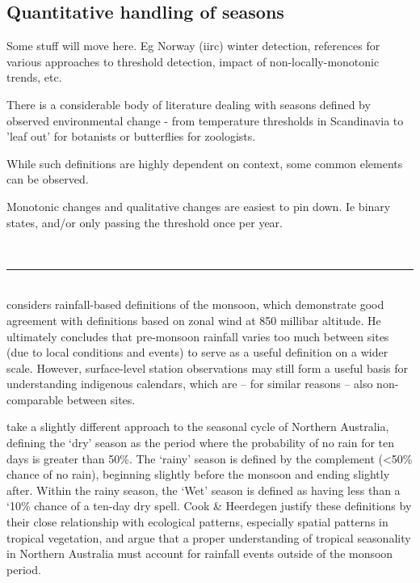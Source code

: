 \subsection{Quantitative handling of seasons}

Some stuff will move here.  Eg Norway (iirc) winter detection,
references for various approaches to threshold detection,
impact of non-locally-monotonic trends, etc.


There is a considerable body of literature dealing with seasons defined
by observed environmental change - from temperature thresholds in
Scandinavia to 'leaf out' for botanists or butterflies for zoologists.

While such definitions are highly dependent on context, some common
elements can be observed.

Monotonic changes and qualitative changes are easiest to pin down.
Ie binary states, and/or only passing the threshold once per year.


~\\ \hrule ~\\


\citet{holland1985} considers rainfall-based definitions of the
monsoon, which demonstrate good agreement with definitions based on zonal
wind at 850 millibar altitude.  He ultimately concludes that pre-monsoon
rainfall varies too much between sites (due to local conditions and events)
to serve as a useful definition on a wider scale.
%
However, surface-level station observations may still form a useful basis for
understanding indigenous calendars, which are -- for similar reasons -- also
non-comparable between sites.

\citet{cook2001} take a slightly different approach to the seasonal cycle of
Northern Australia, defining the `dry' season as the period where the probability
of no rain for ten days is greater than 50\%.  The `rainy' season is defined by
the complement (\textless50\% chance of no rain), beginning slightly before the
monsoon and ending slightly after.  Within the rainy season, the `Wet' season
is defined as having less than a `10\% chance of a ten-day dry spell.
%
Cook \& Heerdegen justify these definitions by their close relationship with
ecological patterns, especially spatial patterns in tropical vegetation,
and argue that a proper understanding of tropical seasonality in Northern
Australia must account for rainfall events outside of the monsoon period.



